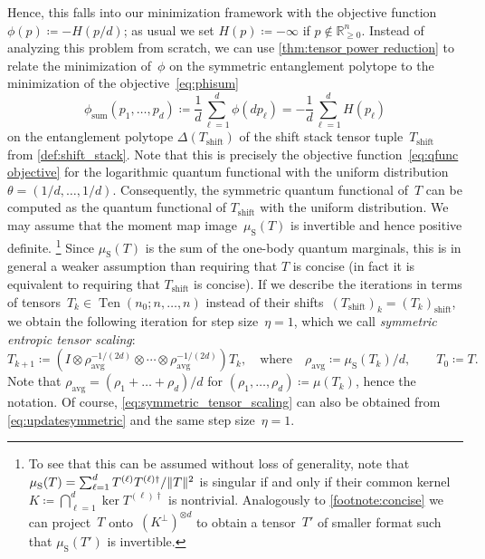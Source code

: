 \documentclass[11pt,letterpaper]{article}
\numberwithin{equation}{section}
\newcommand{\ot}{\otimes}
\newcommand{\RR}{\mathbb{R}}
\DeclareMathOperator{\Sym}{S}
\DeclareMathOperator{\Ten}{Ten}
\DeclareMathOperator{\Shf}{shift}
\DeclareMathOperator{\Sum}{sum}
\DeclarePairedDelimiter\norm{\lVert}{\rVert}
\begin{document}
\noindent
Hence, this falls into our minimization framework with the objective function $\phi(p) \coloneqq -H(p/d)$; as usual we set $H(p)\coloneqq-\infty$ if $p\not\in\RR^n_{\geq0}$.
Instead of analyzing this problem from scratch, we can use \cref{thm:tensor power reduction} to relate the minimization of~$\phi$ on the symmetric entanglement polytope to the minimization of the objective~\eqref{eq:phisum}
\[
    \phi_{\Sum}(p_1, \ldots, p_d) \coloneqq \frac1d\sum_{\ell=1}^d\phi(dp_\ell) = -\frac1d\sum_{\ell=1}^dH(p_\ell)
\]
on the entanglement polytope $\Delta(T_{\Shf})$ of the shift stack tensor tuple~$T_{\Shf}$ from \cref{def:shift_stack}.
Note that this is precisely the objective function~\eqref{eq:qfunc objective} for the logarithmic quantum functional with the uniform distribution $\theta = (1/d, \ldots, 1/d)$.
Consequently, the symmetric quantum functional of~$T$ can be computed as the quantum functional of $T_{\Shf}$ with the uniform distribution.
We may assume that the moment map image~$\mu_{\Sym}(T)$ is invertible and hence positive definite.%
\footnote{\label{footnote:symmetric-concise}To see that this can be assumed without loss of generality, note that $\mu_{\Sym}(T) = \sum_{\ell=1}^d T^{(\ell)} T^{(\ell)\dagger} / \norm T^2$ is singular if and only if their common kernel $K \coloneqq \bigcap_{\ell=1}^d \ker T^{(\ell)\dagger}$ is nontrivial.
Analogously to \cref{footnote:concise} we can project~$T$ onto~$(K^\perp)^{\ot d}$ to obtain a tensor~$T'$ of smaller format such that $\mu_{\Sym}(T')$ is invertible.}
Since $\mu_{\Sym}(T)$ is the sum of the one-body quantum marginals, this is in general a weaker assumption than requiring that $T$ is concise (in fact it is equivalent to requiring that $T_{\Shf}$ is concise).
If we describe the iterations in terms of tensors~$T_k \in \Ten(n_0;n,\dots,n)$ instead of their shifts~$(T_{\Shf})_k = (T_k)_{\Shf}$, we obtain the following iteration for step size~$\eta=1$, which we call \emph{symmetric entropic tensor scaling}:
\begin{equation}\label{eq:symmetric_tensor_scaling}
    T_{k + 1} \coloneqq \left(I\otimes\rho_\text{avg}^{-1/(2d)}\otimes\cdots\otimes\rho_\text{avg}^{-1/(2d)}\right)T_k, \quad \text{where}\quad\rho_\text{avg} \coloneqq \mu_{\Sym}(T_k)/d,\qquad T_0 \coloneqq T.
\end{equation}
Note that $\rho_\text{avg} = (\rho_1+\ldots+\rho_d)/d$ for $(\rho_1,\dots,\rho_d)\coloneqq\mu(T_k)$, hence the notation.
Of course, \cref{eq:symmetric_tensor_scaling} can also be obtained from \cref{eq:updatesymmetric} and the same step size~$\eta=1$.
\end{document}
